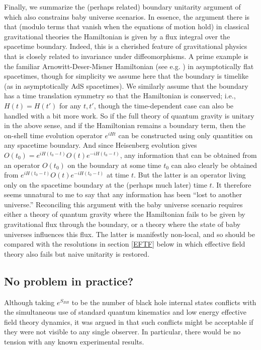 \documentclass[10pt]{article}
\begin{document}
Finally, we summarize the (perhaps related) boundary unitarity argument of \cite{Marolf:2008mf} which also constrains baby universe scenarios.  In essence, the argument there is that (modulo terms that vanish when the equations of motion hold) in classical gravitational theories the Hamiltonian is given by a flux integral over the spacetime boundary.  Indeed, this is a cherished feature of gravitational physics that is closely related to invariance under diffeomorphisms.   A prime example is the familiar Arnowitt-Deser-Misner Hamiltonian (see e.g. \cite{Wald:1984rg}) in asymptotically flat spacetimes, though for simplicity we assume here that the boundary is timelike (as in asymptotically AdS spacetimes).   We similarly assume that the boundary has a time translation symmetry so that the Hamiltonian is conserved; i.e., $H(t) = H(t')$ for any $t,t'$, though the time-dependent case can also be handled with a bit more work.  So if the full theory of quantum gravity is unitary in the above sense, and if the Hamiltonian remains a boundary term, then the on-shell time evolution operator $e^{iHt}$ can be constructed using only quantities on any spacetime boundary.  And since Heisenberg evolution gives
$O(t_0) =  e^{iH(t_0-t)}O(t) e^{-iH(t_0-t)}$, any information that can be obtained from an operator $O(t_0)$ on the boundary at some time $t_0$ can also clearly be obtained from $e^{iH(t_0-t)}O(t) e^{-iH(t_0-t)}$ at time $t$.  But the latter is an operator living only on the spacetime boundary at the (perhaps much later) time $t$.  It therefore seems unnatural to me to say that any information has been ``lost to another universe.''   Reconciling this argument with the baby universe scenario requires either a theory of quantum gravity where the Hamiltonian fails to be given by gravitational flux through the boundary, or a theory where the state of baby universes influences this flux.  The latter is manifestly non-local, and so should be compared with the resolutions in section \ref{EFTF} below in which effective field theory also fails but naive unitarity is restored.

\subsection{No problem in practice?}  Although taking $e^{S_{BH}}$ to be the number of black hole internal states conflicts with the simultaneous use of standard quantum kinematics and low energy effective field theory dynamics, it was argued in \cite{Susskind:1993if} that such conflicts might be acceptable if they were not visible to any single observer.  In particular, there would be no tension with any known experimental results.
\end{document}
